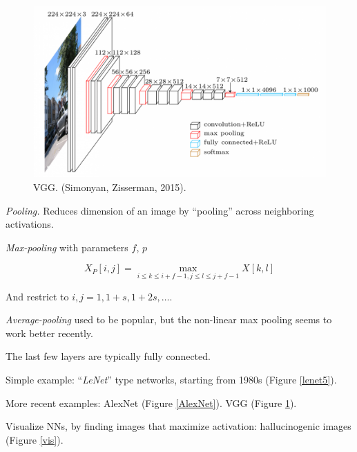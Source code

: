 \documentclass[english]{article}
\begin{document}
\begin{figure}
  \centering
  \includegraphics[scale=0.3]{vgg.png}
    \caption{VGG. (Simonyan, Zisserman, 2015).}
    \label{VGG}
\end{figure}

\eenum 



\item \emph{Pooling.} Reduces dimension of an image by ``pooling'' across neighboring activations. 

\emph{Max-pooling} with parameters $f$, $p$

$$X_P[i,j]=\max_{i\le k \le  i+f-1 ,j \le l \le j+f-1} X[k,l]$$ 

And restrict to $i,j=1,1+s,1+2s,\ldots$.

\emph{Average-pooling} used to be popular, but the non-linear max pooling seems to work better recently. 

\item The last few layers are typically fully connected.

Simple example: ``\emph{LeNet}'' type networks, starting from 1980s (Figure \ref{lenet5}). 

More recent examples: AlexNet (Figure \ref{AlexNet}). VGG (Figure \ref{VGG}). 

\item Visualize NNs, by finding images that maximize activation: hallucinogenic images (Figure \ref{vis}).
\end{document}
